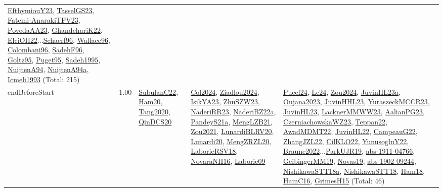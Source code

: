 {\begin{longtable}{p{3cm}r>{\raggedright\arraybackslash}p{6cm}>{\raggedright\arraybackslash}p{6cm}>{\raggedright\arraybackslash}p{8cm}}
\hyperref[detail:EfthymiouY23]{EfthymiouY23}, \hyperref[detail:TasselGS23]{TasselGS23}, \hyperref[detail:Fatemi-AnarakiTFV23]{Fatemi-AnarakiTFV23}, \hyperref[detail:PovedaAA23]{PovedaAA23}, \hyperref[detail:GhandehariK22]{GhandehariK22}, \hyperref[detail:ElciOH22]{ElciOH22}...\hyperref[detail:Schaerf96]{Schaerf96}, \hyperref[detail:Wallace96]{Wallace96}, \hyperref[detail:Colombani96]{Colombani96}, \hyperref[detail:SadehF96]{SadehF96}, \hyperref[detail:Goltz95]{Goltz95}, \hyperref[detail:Puget95]{Puget95}, \hyperref[detail:Sadeh1995]{Sadeh1995}, \hyperref[detail:NuijtenA94]{NuijtenA94}, \hyperref[detail:NuijtenA94a]{NuijtenA94a}, \hyperref[detail:Icmeli1993]{Icmeli1993} (Total: 215)\\
\index{endBeforeStart}\index{Constraints!endBeforeStart}endBeforeStart &  1.00 & \hyperref[detail:SubulanC22]{SubulanC22}, \hyperref[detail:Ham20]{Ham20}, \hyperref[detail:Tang2020]{Tang2020}, \hyperref[detail:QinDCS20]{QinDCS20} & \hyperref[detail:Col2024]{Col2024}, \hyperref[detail:Ziadlou2024]{Ziadlou2024}, \hyperref[detail:IsikYA23]{IsikYA23}, \hyperref[detail:ZhuSZW23]{ZhuSZW23}, \hyperref[detail:NaderiRR23]{NaderiRR23}, \hyperref[detail:NaderiBZ22a]{NaderiBZ22a}, \hyperref[detail:PandeyS21a]{PandeyS21a}, \hyperref[detail:MengLZB21]{MengLZB21}, \hyperref[detail:Zou2021]{Zou2021}, \hyperref[detail:LunardiBLRV20]{LunardiBLRV20}, \hyperref[detail:Lunardi20]{Lunardi20}, \hyperref[detail:MengZRZL20]{MengZRZL20}, \hyperref[detail:LaborieRSV18]{LaborieRSV18}, \hyperref[detail:NovaraNH16]{NovaraNH16}, \hyperref[detail:Laborie09]{Laborie09} & \hyperref[detail:Pucel24]{Pucel24}, \hyperref[detail:Le24]{Le24}, \hyperref[detail:Zou2024]{Zou2024}, \hyperref[detail:JuvinHL23a]{JuvinHL23a}, \hyperref[detail:Oujana2023]{Oujana2023}, \hyperref[detail:JuvinHHL23]{JuvinHHL23}, \hyperref[detail:YuraszeckMCCR23]{YuraszeckMCCR23}, \hyperref[detail:JuvinHL23]{JuvinHL23}, \hyperref[detail:LacknerMMWW23]{LacknerMMWW23}, \hyperref[detail:AalianPG23]{AalianPG23}, \hyperref[detail:CzerniachowskaWZ23]{CzerniachowskaWZ23}, \hyperref[detail:Teppan22]{Teppan22}, \hyperref[detail:AwadMDMT22]{AwadMDMT22}, \hyperref[detail:JuvinHL22]{JuvinHL22}, \hyperref[detail:CampeauG22]{CampeauG22}, \hyperref[detail:ZhangJZL22]{ZhangJZL22}, \hyperref[detail:CilKLO22]{CilKLO22}, \hyperref[detail:YunusogluY22]{YunusogluY22}, \hyperref[detail:Braune2022]{Braune2022}...\hyperref[detail:ParkUJR19]{ParkUJR19}, \hyperref[detail:abs-1911-04766]{abs-1911-04766}, \hyperref[detail:GeibingerMM19]{GeibingerMM19}, \hyperref[detail:Novas19]{Novas19}, \hyperref[detail:abs-1902-09244]{abs-1902-09244}, \hyperref[detail:NishikawaSTT18a]{NishikawaSTT18a}, \hyperref[detail:NishikawaSTT18]{NishikawaSTT18}, \hyperref[detail:Ham18]{Ham18}, \hyperref[detail:HamC16]{HamC16}, \hyperref[detail:GrimesH15]{GrimesH15} (Total: 46)\\

\end{longtable}}
